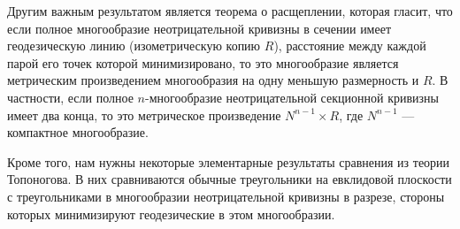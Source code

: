 Другим важным результатом является теорема о расщеплении, которая гласит, что если полное 
многообразие неотрицательной кривизны в сечении имеет геодезическую линию (изометрическую копию 
$R$), расстояние между каждой парой его точек которой минимизировано, то это многообразие 
является метрическим произведением многообразия на одну меньшую размерность и $R$. В частности, если 
полное $n$-многообразие неотрицательной секционной кривизны имеет два конца, то это 
метрическое произведение $N^{n-1} \times R$, где $N^{n-1}$ — компактное многообразие.

Кроме того, нам нужны некоторые элементарные результаты сравнения из теории Топоногова. 
В них сравниваются обычные треугольники на евклидовой плоскости с треугольниками в многообразии 
неотрицательной кривизны в разрезе, стороны которых минимизируют геодезические в этом 
многообразии.



